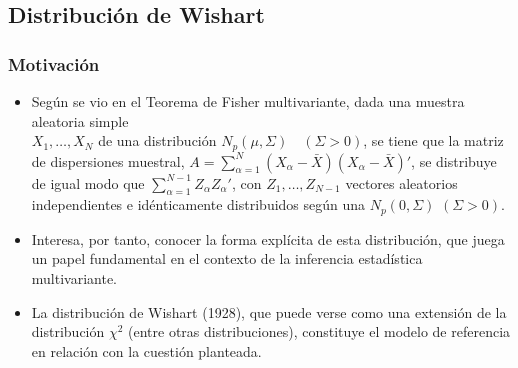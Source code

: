 \documentclass[11pt,a4paper]{article}
\begin{document}
\subsection{Distribución de Wishart}
\subsubsection{Motivación}
\begin{itemize}
\item Según se vio en el Teorema de Fisher multivariante, dada una muestra aleatoria simple \\ $X_{1}, \dots, X_{N}$ de una distribución $N_{p}(\mu, \Sigma) \quad (\Sigma > 0)$, se tiene que la matriz de dispersiones muestral, $A = \sum_{\alpha=1}^{N}(X_{\alpha}-\bar{X})(X_{\alpha}-\bar{X})'$, se distribuye de igual modo que $\sum_{\alpha=1}^{N-1}Z_{\alpha}Z_{\alpha}'$, con $Z_{1}, \dots, Z_{N-1}$ vectores aleatorios independientes e idénticamente distribuidos según una $N_{p}(0, \Sigma)$ $(\Sigma > 0)$.

\item Interesa, por tanto, conocer la forma explícita de esta distribución, que juega un papel fundamental en el contexto de la inferencia estadística multivariante.

\item La distribución de Wishart (1928), que puede verse como una extensión de la distribución $\chi^{2}$ (entre otras distribuciones), constituye el modelo de referencia en relación con la cuestión planteada.
\end{itemize}
\end{document}
